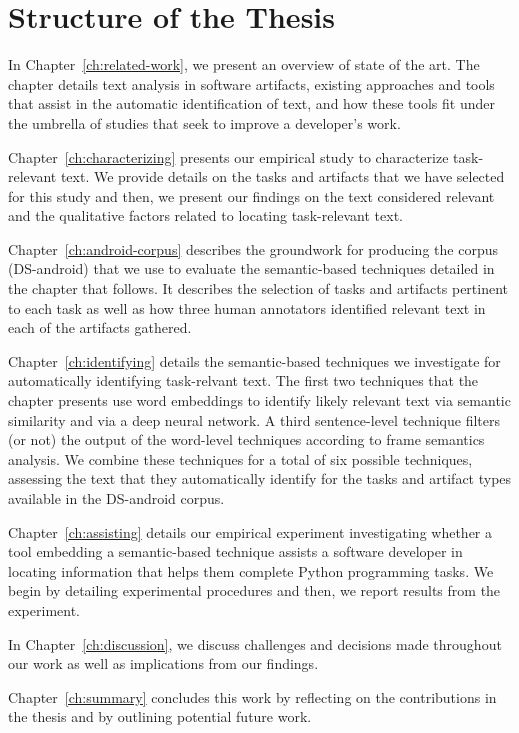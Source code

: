 \section{Structure of the Thesis}
\label{cp1:organization}



In Chapter~\ref{ch:related-work}, we present an overview of state of the art. The chapter details 
text analysis in software artifacts, existing approaches and tools 
that assist in the automatic
identification of text, and how these tools fit under the 
umbrella of studies that seek to 
improve a developer's work.


Chapter~\ref{ch:characterizing} presents our empirical study to characterize task-relevant text.
We provide details on the tasks and artifacts that we have selected for this study
and then, we present our findings on the text considered relevant 
and the qualitative factors related to locating task-relevant text.


Chapter~\ref{ch:android-corpus} describes the groundwork 
for producing the corpus (\acs{DS-android}) that we use to evaluate the semantic-based techniques 
detailed in the chapter that follows. It describes the selection of tasks 
and 
artifacts pertinent to each task 
as well as how three human annotators identified relevant text in each of the artifacts gathered.


Chapter~\ref{ch:identifying} details the semantic-based techniques we investigate for automatically 
identifying task-relvant text.
The first two techniques that the chapter presents 
use word embeddings to identify likely relevant text via semantic similarity
and via a deep neural network.
A third sentence-level technique filters (or not) 
the output of the word-level techniques according to frame semantics analysis.
We combine these techniques for a total of six possible techniques, 
assessing 
the text that they automatically identify for the tasks and artifact types
available in the \acs{DS-android} corpus.




Chapter~\ref{ch:assisting} details our empirical experiment investigating 
whether a tool embedding a semantic-based technique assists a software developer in locating information
that helps them complete Python programming tasks. We begin by detailing experimental procedures
and then, we report results from the experiment.


In Chapter~\ref{ch:discussion}, we discuss challenges and decisions 
made throughout our work 
as well as implications from our findings. 


Chapter~\ref{ch:summary} concludes this work by reflecting on the contributions in the thesis
and by outlining  potential future work. 

